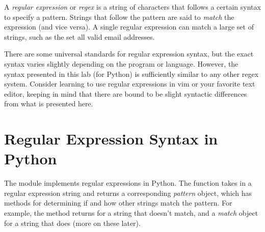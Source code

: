 



A \emph{regular expression} or \emph{regex} is a string of characters that follows a certain syntax to specify a pattern.
Strings that follow the pattern are said to \emph{match} the expression (and vice versa).
A single regular expression can match a large set of strings, such as the set all valid email addresses.

\begin{warn}
There are some universal standards for regular expression syntax, but the exact syntax varies slightly depending on the program or language.
However, the syntax presented in this lab (for Python) is sufficiently similar to any other regex system.
Consider learning to use regular expressions in vim or your favorite text editor, keeping in mind that there are bound to be slight syntactic differences from what is presented here.
\end{warn}

\section*{Regular Expression Syntax in Python} %

The  module implements regular expressions in Python.
The function  takes in a regular expression string and returns a corresponding \emph{pattern} object, which has methods for determining if and how other strings match the pattern.
For example, the  method returns  for a string that doesn't match, and a \emph{match} object for a string that does (more on these later).

